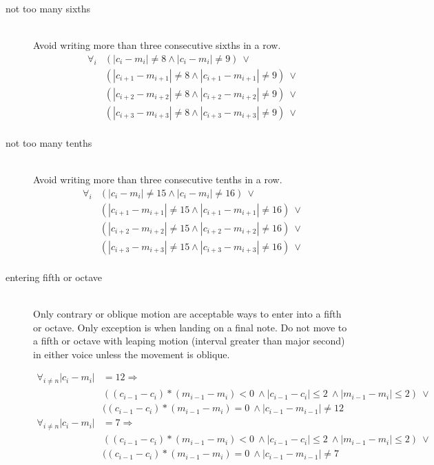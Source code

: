 \documentclass[11pt]{article} %
\begin{document}
\begin{description}
\item[not too many sixths]\hfill\\
Avoid writing more than three consecutive sixths in a row. 
\begin{align*}
\forall_i&(|c_i - m_i| \neq 8 \land |c_i - m_i| \neq 9)\ \lor\\
&(|c_{i+1} - m_{i+1}| \neq 8 \land |c_{i+1} - m_{i+1}| \neq 9)\ \lor\\
&(|c_{i+2} - m_{i+2}| \neq 8 \land |c_{i+2} - m_{i+2}| \neq 9)\ \lor\\
&(|c_{i+3} - m_{i+3}| \neq 8 \land |c_{i+3} - m_{i+3}| \neq 9)\ \lor\\
\end{align*}

\item[not too many tenths]\hfill\\
Avoid writing more than three consecutive tenths in a row. 
\begin{align*}
\forall_i&(|c_i - m_i| \neq 15 \land |c_i - m_i| \neq 16)\ \lor\\
&(|c_{i+1} - m_{i+1}| \neq 15 \land |c_{i+1} - m_{i+1}| \neq 16)\ \lor\\
&(|c_{i+2} - m_{i+2}| \neq 15 \land |c_{i+2} - m_{i+2}| \neq 16)\ \lor\\
&(|c_{i+3} - m_{i+3}| \neq 15 \land |c_{i+3} - m_{i+3}| \neq 16)\ \lor\\
\end{align*}

\item[entering fifth or octave]\hfill\\
Only contrary or oblique motion are acceptable ways to enter into a fifth or octave. Only exception is when landing on a final note. Do not move to a fifth or octave with leaping motion (interval greater than major second) in either voice unless the movement is oblique. 

\begin{align*}
\forall_{i\neq n}|c_i - m_i| &= 12 \Rightarrow\\
&((c_{i-1} - c_i)*(m_{i-1}-m_i) < 0\ \land |c_{i-1} - c_i| \leq 2\ \land |m_{i-1} - m_i| \leq 2)\ \lor\\
&((c_{i-1} - c_i)*(m_{i-1}-m_i) = 0\ \land |c_{i-1} - m_{i-1}| \neq 12
\end{align*}
\begin{align*}
\forall_{i\neq n}|c_i - m_i| &= 7 \Rightarrow\\
&((c_{i-1} - c_i)*(m_{i-1}-m_i) < 0\ \land |c_{i-1} - c_i| \leq 2\ \land |m_{i-1} - m_i| \leq 2)\ \lor\\
&((c_{i-1} - c_i)*(m_{i-1}-m_i) = 0\ \land |c_{i-1} - m_{i-1}| \neq 7
\end{align*}


\end{description}
\end{document}
